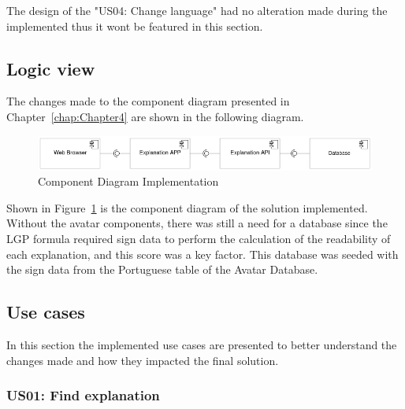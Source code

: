 The design of the "US04: Change language" had no alteration made during the implemented thus it wont be featured in this section.

\subsection{Logic view}

The changes made to the component diagram presented in Chapter~\ref{chap:Chapter4} are shown in the following diagram.

\begin{figure}[H]
\centering
\includegraphics[width=\textwidth,keepaspectratio]{ch5/assets/component_diagram_Implement.png}
\caption[Component Diagram Implementation]{Component Diagram Implementation}
\label{fig:componentImp}
\end{figure}

Shown in Figure~\ref{fig:componentImp} is the component diagram of the solution implemented.
Without the avatar components, there was still a need for a database since the \gls{LGP} formula required sign data to perform the calculation of the readability of each explanation, and this score was a key factor.
This database was seeded with the sign data from the Portuguese table of the Avatar Database.

\subsection{Use cases}

In this section the implemented use cases are presented to better understand the changes made and how they impacted the final solution.

\subsubsection{US01: Find explanation}

